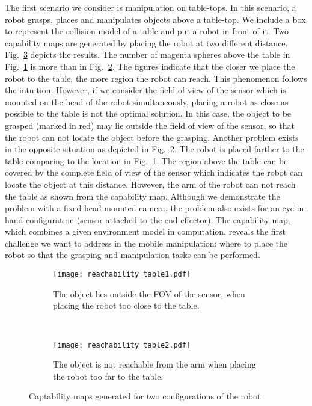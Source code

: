 The first scenario we consider is manipulation on table-tops. In this scenario, a robot grasps, places and manipulates objects above a table-top. We include a box to represent the collision model of a table and put a robot in front of it. Two capability maps are generated by placing the robot at two different distance. Fig.~\ref{fig:cmap_tables} depicts the results. The number of magenta spheres above the table in Fig.~\ref{fig:cmap_table1} is more than in Fig.~\ref{fig:cmap_table2}. The figures indicate that the closer we place the robot to the table, the more region the robot can reach. This phenomenon follows the intuition. However, if we consider the field of view of the sensor which is mounted on the head of the robot simultaneously, placing a robot as close as possible to the table is not the optimal solution. In this case, the object to be grasped (marked in red) may lie outside the field of view of the sensor, so that the robot can not locate the object before the grasping. Another problem exists in the opposite situation as depicted in Fig.~\ref{fig:cmap_table2}. The robot is placed farther to the table comparing to the location in Fig.~\ref{fig:cmap_table1}. The region above the table can be covered by the complete field of view of the sensor which indicates the robot can locate the object at this distance. However, the arm of the robot can not reach the table as shown from the capability map. Although we demonstrate the problem with a fixed head-mounted camera, the problem also exists for an eye-in-hand configuration (sensor attached to the end effector). The capability map, which combines a given environment model in computation,  reveals the first challenge we want to address in the mobile manipulation: where to place the robot so that the grasping and manipulation tasks can be performed. 

\begin{figure}[!htbp]
    \centering
    \begin{subfigure}[b]{0.37\textwidth}
        \texttt{[image: reachability\_table1.pdf]}
        \caption{The object lies outside the FOV of the sensor, when placing the robot too close to the table.}
        \label{fig:cmap_table1}
    \end{subfigure}
    ~ %
    \begin{subfigure}[b]{0.45\textwidth}
        \texttt{[image: reachability\_table2.pdf]}
        \caption{The object is not reachable from the arm when placing the robot too far to the table.}
        \label{fig:cmap_table2}
    \end{subfigure}
    \caption{Captability maps generated for two configurations of the robot}\label{fig:cmap_tables}
\end{figure}

